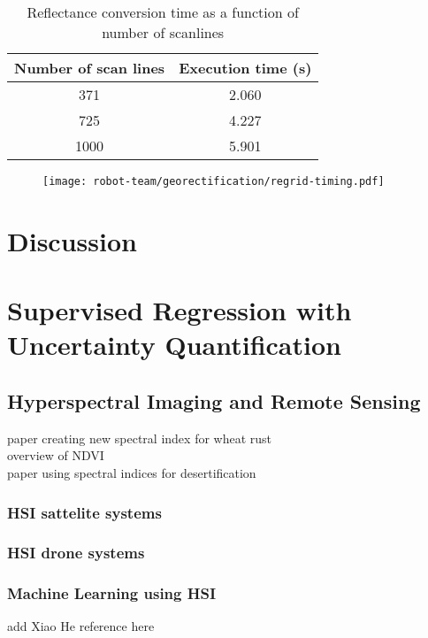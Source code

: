 \begin{table}[h]
  \centering
  \begin{tabular}{ |c|c| }
    \hline 
    \textbf{Number of scan lines}	& \textbf{Execution time (s)}\\
    \hline 
    371		&   2.060	\\
    725     &   4.227	\\
    1000    &   5.901  \\
    \hline 
  \end{tabular}
  \caption{Reflectance conversion time as a function of number of scanlines}
  \label{tab:reflectance-times}
\end{table}

\begin{figure}[!hbt]
  \texttt{[image: robot-team/georectification/regrid-timing.pdf]}
  \caption{}
  \label{fig-regridding-timing}
\end{figure}



\section{Discussion}



\section{Supervised Regression with Uncertainty Quantification}

\subsection{Hyperspectral Imaging and Remote Sensing}
paper creating new spectral index for wheat rust \cite{SpectralIndexWheat} \\ 
overview of NDVI \cite{SpectralIndexNDVI} \\ 
paper using spectral indices for desertification \cite{SpectralIndexDesertification}


\subsubsection{HSI sattelite systems}
\subsubsection{HSI drone systems}
\subsubsection{Machine Learning using HSI}
add Xiao He reference here \cite{yu2021pm2}

